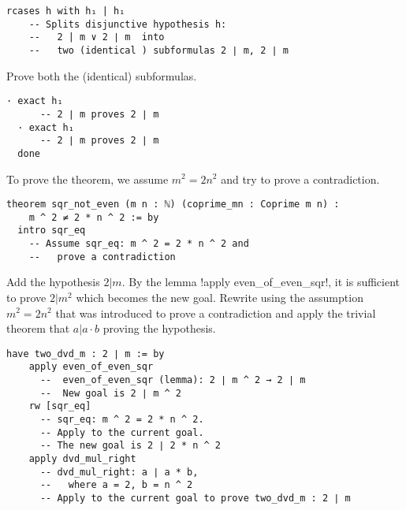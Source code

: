 \begin{Verbatim}[firstnumber=last]
  rcases h with h₁ | h₁
    -- Splits disjunctive hypothesis h: 
    --   2 | m ∨ 2 ∣ m  into
    --   two (identical ) subformulas 2 ∣ m, 2 ∣ m
\end{Verbatim}
Prove both the (identical) subformulas.
\begin{Verbatim}[firstnumber=last]
  · exact h₁
      -- 2 ∣ m proves 2 ∣ m
  · exact h₁
      -- 2 ∣ m proves 2 ∣ m
  done
\end{Verbatim}


To prove the theorem, we assume $m^2=2n^2$ and try to prove a contradiction.
\begin{Verbatim}[firstnumber=last]
theorem sqr_not_even (m n : ℕ) (coprime_mn : Coprime m n) :
    m ^ 2 ≠ 2 * n ^ 2 := by
  intro sqr_eq
    -- Assume sqr_eq: m ^ 2 = 2 * n ^ 2 and
    --   prove a contradiction
\end{Verbatim}

Add the hypothesis $2|m$. By the lemma !apply even_of_even_sqr!, it is sufficient to prove $2 | m^2$ which becomes the new goal. Rewrite using the assumption $m^2=2n^2$ that was introduced to prove a contradiction and apply the trivial theorem that $a | a\cdot b$ proving the hypothesis.

\begin{Verbatim}[firstnumber=last]
  have two_dvd_m : 2 ∣ m := by
    apply even_of_even_sqr
      --  even_of_even_sqr (lemma): 2 ∣ m ^ 2 → 2 ∣ m
      --  New goal is 2 ∣ m ^ 2
    rw [sqr_eq]
      -- sqr_eq: m ^ 2 = 2 * n ^ 2.
      -- Apply to the current goal.
      -- The new goal is 2 ∣ 2 * n ^ 2
    apply dvd_mul_right
      -- dvd_mul_right: a ∣ a * b,
      --   where a = 2, b = n ^ 2
      -- Apply to the current goal to prove two_dvd_m : 2 ∣ m
\end{Verbatim}

